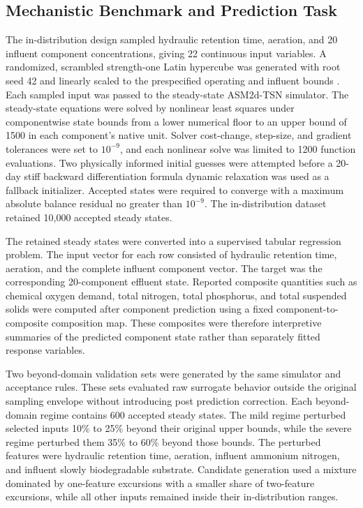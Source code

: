 \documentclass[12pt, twoside]{book}
\begin{document}
\subsection{Mechanistic Benchmark and Prediction Task}

The in-distribution design sampled hydraulic retention time, aeration, and 20 influent component
concentrations, giving 22 continuous input variables. A randomized, scrambled strength-one Latin hypercube was
generated with root seed 42 and linearly scaled to the prespecified operating and influent bounds
\citep{McKay1979}. Each sampled input was passed to the steady-state ASM2d-TSN simulator. The steady-state
equations were solved by nonlinear least squares under componentwise state bounds from a lower numerical floor
to an upper bound of 1500 in each component's native unit. Solver cost-change, step-size, and gradient
tolerances were set to \(10^{-9}\), and each nonlinear solve was limited to 1200 function evaluations. Two
physically informed initial guesses were attempted before a 20-day stiff backward differentiation formula
dynamic relaxation was used as a fallback initializer. Accepted states were required to converge with a
maximum absolute balance residual no greater than \(10^{-9}\). The in-distribution dataset retained 10,000
accepted steady states.

The retained steady states were converted into a supervised tabular regression problem. The input vector for
each row consisted of hydraulic retention time, aeration, and the complete influent component vector. The
target was the corresponding 20-component effluent state. Reported composite quantities such as chemical
oxygen demand, total nitrogen, total phosphorus, and total suspended solids were computed after component
prediction using a fixed component-to-composite composition map. These composites were therefore
interpretive summaries of the predicted component state rather than separately fitted response variables.

Two beyond-domain validation sets were generated by the same simulator and acceptance rules. These sets
evaluated raw surrogate behavior outside the original sampling envelope without introducing post prediction
correction. Each beyond-domain regime contains 600 accepted steady states. The mild regime perturbed selected
inputs 10\% to 25\% beyond their original upper bounds, while the severe regime perturbed them 35\% to 60\%
beyond those bounds. The perturbed features were hydraulic retention time, aeration, influent ammonium
nitrogen, and influent slowly biodegradable substrate. Candidate generation used a mixture dominated by
one-feature excursions with a smaller share of two-feature excursions, while all other inputs remained inside
their in-distribution ranges.
\end{document}
